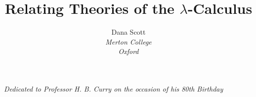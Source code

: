 %
%
%

\date{}
\def\to{\rightarrow}
\def\imp{\shortrightarrow}
\def\iff{\leftrightarrow}
\def\union{\cup}
\def\inc{\subseteq}
\def\dom{\mathop{\rm dom}}
\def\cod{\mathop{\rm cod}}
\def\id{{\textrm 1}}
\def\res{\!\upharpoonleft\!}
\def\ffam{\varphi}
\def\comp{\circ}
\def\bbone{\mathbb 1}
\def\zeromap{0}
\def\bbzero{{\mathbb O}}
\def\ccc{{c.c.c.}}
\def\ev{\varepsilon}
\def\ebc{\varepsilon_{BC}}
\def\L{\Lambda}
\def\l{\lambda}
\def\lm#1.#2{\lambda#1.\, #2}
\def\br#1{[\, #1 \, ]}
\def\V{V}
\def\U{U}
\def\D{D}
\def\C{\mathcal C}
\def\S{\mathcal S}
\def\lxy{\l x\, \l y . \,}
\def\lmm#1#2.#3{\l #1\, \l #2 . \, #3}
\def\sss{(*\!*\!*)}
\def\ss{(**)}
\def\ssn{(**_n)}
\def\scop{\S^{\C^{op}}}
\def\PU{\mathcal P U}
\def\P{\mathcal P}
\def\mm{\mathrel {||}\joinrel \relbar}
\def\UU{(U\to U)}
\def\BA{B \to A}
\def\AB{A \to B}

\makeatletter
\newcommand*\dotop{\mathpalette\bigcdot@{.6}}
\newcommand*\bigcdot@[2]{\mathbin{\vcenter{\hbox{\scalebox{#2}{$\m@th#1\bullet$}}}}}
\makeatother

\title{Relating Theories of the $\lambda$-Calculus}
\author{Dana Scott \\
{\small\it Merton College}\\
{\small\it Oxford}}

\maketitle
\bigskip
{\centerline
{\small\it Dedicated to Professor H. B. Curry on the occasion of his 80th Birthday}}
\bigskip

